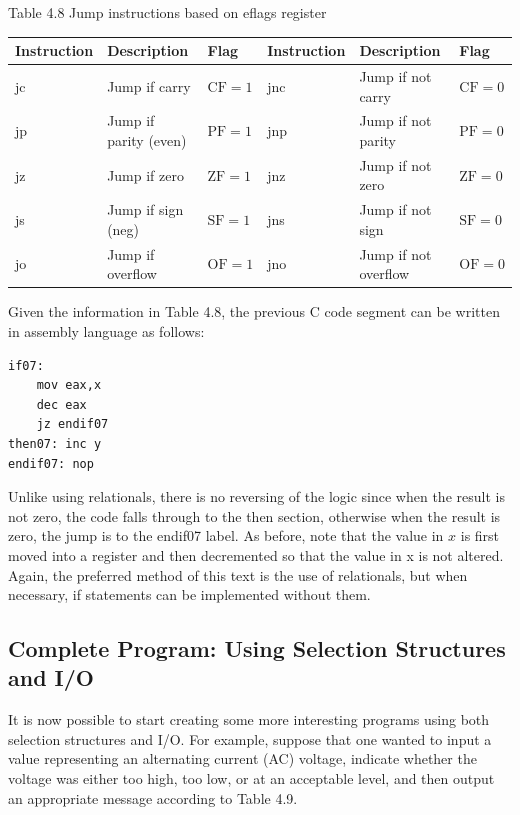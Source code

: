 \documentclass[10pt]{book}
\begin{document}
Table 4.8 Jump instructions based on eflags register
\begin{center}
\begin{tabular}{|l|l|l|l|l|l|}
\hline
Instruction & Description & Flag & Instruction & Description & Flag \\
\hline
jc & Jump if carry & $\mathrm{CF}=1$ & jnc & Jump if not carry & $\mathrm{CF}=0$ \\
\hline
jp & Jump if parity (even) & $\mathrm{PF}=1$ & jnp & Jump if not parity & $\mathrm{PF}=0$ \\
\hline
jz & Jump if zero & $\mathrm{ZF}=1$ & jnz & Jump if not zero & $\mathrm{ZF}=0$ \\
\hline
js & Jump if sign (neg) & $\mathrm{SF}=1$ & jns & Jump if not sign & $\mathrm{SF}=0$ \\
\hline
jo & Jump if overflow & $\mathrm{OF}=1$ & jno & Jump if not overflow & $\mathrm{OF}=0$ \\
\hline
\end{tabular}
\end{center}

Given the information in Table 4.8, the previous C code segment can be written in assembly language as follows:

\begin{verbatim}
if07:
    mov eax,x
    dec eax
    jz endif07
then07: inc y
endif07: nop
\end{verbatim}

Unlike using relationals, there is no reversing of the logic since when the result is not zero, the code falls through to the then section, otherwise when the result is zero, the jump is to the endif07 label. As before, note that the value in $x$ is first moved into a register and then decremented so that the value in x is not altered. Again, the preferred method of this text is the use of relationals, but when necessary, if statements can be implemented without them.

\subsection{Complete Program: Using Selection Structures and I/O}
It is now possible to start creating some more interesting programs using both selection structures and I/O. For example, suppose that one wanted to input a value representing an alternating current (AC) voltage, indicate whether the voltage was either too high, too low, or at an acceptable level, and then output an appropriate message according to Table 4.9.
\end{document}
